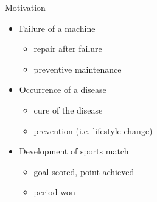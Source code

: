 \documentclass[american]{beamer}
\begin{document}
    \begin{frame}{Motivation}
        \begin{itemize}
            \item Failure of a machine
            \begin{itemize}
                \item repair after failure
                \item preventive maintenance
            \end{itemize}
            \item Occurrence of a disease
            \begin{itemize}
                \item cure of the disease
                \item prevention (i.e. lifestyle change)
            \end{itemize}
            \item Development of sports match
            \begin{itemize}
                \item goal scored, point achieved
                \item period won
            \end{itemize}
        \end{itemize}
    \end{frame}
\end{document}
